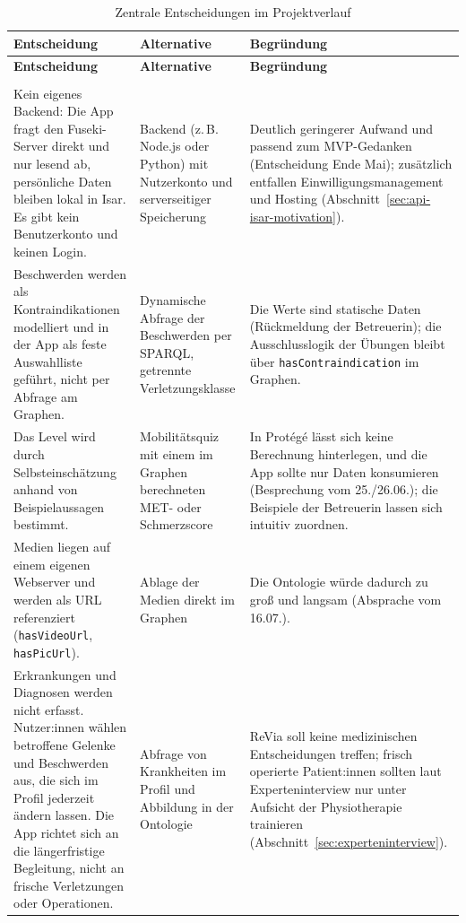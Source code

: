 {\renewcommand{\arraystretch}{1.3}
\begin{xltabular}{\textwidth}{@{} >{\raggedright\arraybackslash}p{5.2cm} >{\raggedright\arraybackslash}p{3.3cm} >{\raggedright\arraybackslash}X @{}}
    \caption{Zentrale Entscheidungen im Projektverlauf}
    \label{tab:entscheidungen} \\
    \toprule
    \textbf{Entscheidung} & \textbf{Alternative} & \textbf{Begründung} \\
    \midrule
    \endfirsthead
    \toprule
    \textbf{Entscheidung} & \textbf{Alternative} & \textbf{Begründung} \\
    \midrule
    \endhead
    \midrule
     \\
    \endfoot
    \bottomrule
    \endlastfoot
    Kein eigenes Backend: Die App fragt den Fuseki-Server direkt und nur lesend ab, persönliche Daten bleiben lokal in Isar. Es gibt kein Benutzerkonto und keinen Login. & Backend (z.\,B. Node.js oder Python) mit Nutzerkonto und serverseitiger Speicherung & Deutlich geringerer Aufwand und passend zum MVP-Gedanken (Entscheidung Ende Mai); zusätzlich entfallen Einwilligungsmanagement und Hosting (Abschnitt~\ref{sec:api-isar-motivation}). \\
    Beschwerden werden als Kontraindikationen modelliert und in der App als feste Auswahlliste geführt, nicht per Abfrage am Graphen. & Dynamische Abfrage der Beschwerden per SPARQL, getrennte Verletzungsklasse & Die Werte sind statische Daten (Rückmeldung der Betreuerin); die Ausschlusslogik der Übungen bleibt über \texttt{hasContraindication} im Graphen. \\
    Das Level wird durch Selbsteinschätzung anhand von Beispielaussagen bestimmt. & Mobilitätsquiz mit einem im Graphen berechneten MET- oder Schmerzscore & In Protégé lässt sich keine Berechnung hinterlegen, und die App sollte nur Daten konsumieren (Besprechung vom 25./26.06.); die Beispiele der Betreuerin lassen sich intuitiv zuordnen. \\
    Medien liegen auf einem eigenen Webserver und werden als URL referenziert (\texttt{hasVideoUrl}, \texttt{hasPicUrl}). & Ablage der Medien direkt im Graphen & Die Ontologie würde dadurch zu groß und langsam (Absprache vom 16.07.). \\
    Erkrankungen und Diagnosen werden nicht erfasst. Nutzer:innen wählen betroffene Gelenke und Beschwerden aus, die sich im Profil jederzeit ändern lassen. Die App richtet sich an die längerfristige Begleitung, nicht an frische Verletzungen oder Operationen. & Abfrage von Krankheiten im Profil und Abbildung in der Ontologie & ReVia soll keine medizinischen Entscheidungen treffen; frisch operierte Patient:innen sollten laut Experteninterview nur unter Aufsicht der Physiotherapie trainieren (Abschnitt~\ref{sec:experteninterview}). \\

\end{xltabular}}
